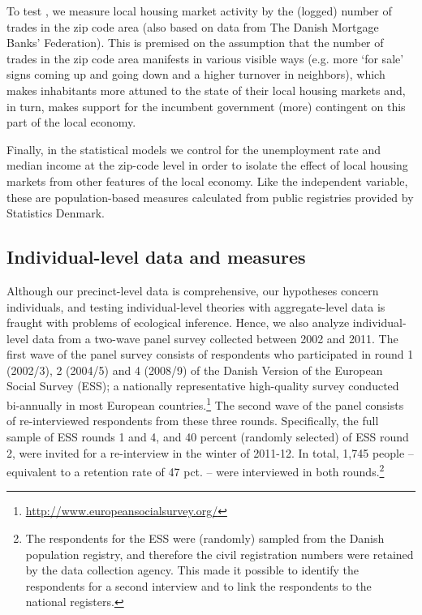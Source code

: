 \documentclass[12pt,a4paper]{article}
\begin{document}
	To test \htwo, we measure local housing market activity by the (logged) number of trades in the zip code area (also based on data from The Danish Mortgage Banks' Federation). This is premised on the assumption that the number of trades in the zip code area manifests in various visible ways (e.g. more ‘for sale’ signs coming up and going down and a higher turnover in neighbors), which makes inhabitants more attuned to the state of their local housing markets and, in turn, makes support for the incumbent government (more) contingent on this part of the local economy.
	
	Finally, in the statistical models we control for the unemployment rate and median income at the zip-code level in order to isolate the effect of local housing markets from other features of the local economy. Like the independent variable, these are population-based measures calculated from public registries provided by Statistics Denmark.
	
	\subsection{Individual-level data and measures}\label{individuallevel}
	Although our precinct-level data is comprehensive, our hypotheses concern individuals, and testing individual-level theories with aggregate-level data is fraught with problems of ecological inference. Hence, we also analyze individual-level data from a two-wave panel survey collected between 2002 and 2011. The first wave of the panel survey consists of respondents who participated in round 1 (2002/3), 2 (2004/5) and 4 (2008/9) of the Danish Version of the European Social Survey (ESS); a nationally representative high-quality survey conducted bi-annually in most European countries.\footnote{\href{http://www.europeansocialsurvey.org/}{http://www.europeansocialsurvey.org/}} The second wave of the panel consists of re-interviewed respondents from these three rounds. Specifically, the full sample of ESS rounds 1 and 4, and 40 percent (randomly selected) of ESS round 2, were invited for a re-interview in the winter of 2011-12. In total, 1,745 people – equivalent to a retention rate of 47 pct. – were interviewed in both rounds.\footnote{The respondents for the ESS were (randomly) sampled from the Danish population registry, and therefore the civil registration numbers were retained by the data collection agency. This made it possible to identify the respondents for a second interview and to link the respondents to the national registers.} 
	
\end{document}
